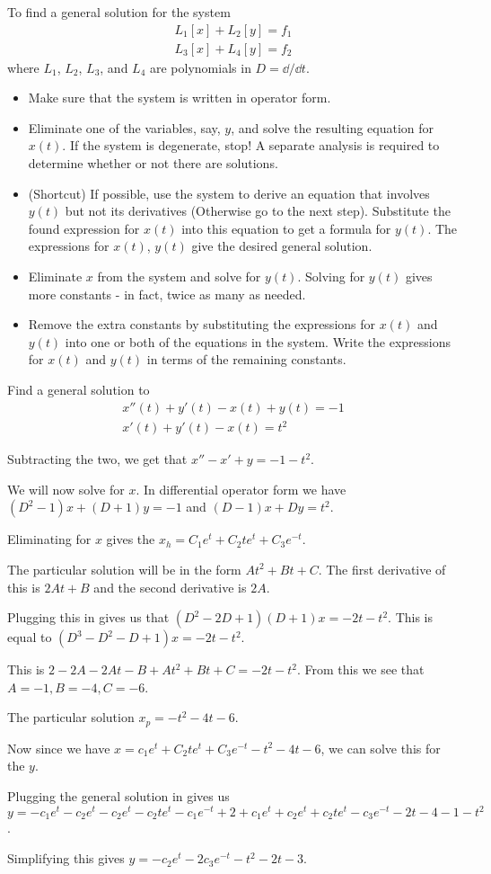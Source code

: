 \documentclass[../diffeq.tex]{subfiles}
\begin{document}
To find a general solution for the system 
\begin{align*}
    L_1[x]+L_2[y]=f_1 \\
    L_3[x]+L_4[y]=f_2    
\end{align*}
where $L_1$, $L_2$, $L_3$, and $L_4$ are polynomials in $D=\dd / \dd t$.
\begin{itemize}
    \item Make sure that the system is written in operator form.
    \item Eliminate one of the variables, say, $y$, and solve the resulting equation for $x(t)$. If the system is degenerate, stop! A separate analysis is required to determine whether or not there are solutions.
    \item (Shortcut) If possible, use the system to derive an equation that involves $y(t)$ but not its derivatives (Otherwise go to the next step). Substitute the found expression for $x(t)$ into this equation to get a formula for $y(t)$. The expressions for $x(t)$, $y(t)$ give the desired general solution.
    \item Eliminate $x$ from the system and solve for $y(t)$. Solving for $y(t)$ gives more constants - in fact, twice as many as needed.
    \item Remove the extra constants by substituting the expressions for $x(t)$ and $y(t)$ into one or both of the equations in the system. Write the expressions for $x(t)$ and $y(t)$ in terms of the remaining constants.
\end{itemize}

\begin{example}
    Find a general solution to 
    \begin{align*}
        x''(t)+y'(t)-x(t)+y(t)=-1 \\ 
        x'(t)+y'(t)-x(t)=t^2
    \end{align*}

    Subtracting the two, we get that $x''-x'+y=-1-t^2$.

    We will now solve for $x$. In differential operator form we have $(D^2-1)x+(D+1)y=-1$ and $(D-1)x+Dy=t^2$.

    Eliminating for $x$ gives the $x_h=C_1e^t+C_2te^t+C_3e^{-t}$.

    The particular solution will be in the form $At^2+Bt+C$. The first derivative of this is $2At+B$ and the second derivative is $2A$.

    Plugging this in gives us that $(D^2-2D+1)(D+1)x=-2t-t^2$. This is equal to $(D^3-D^2-D+1)x=-2t-t^2$.

    This is $2-2A-2At-B+At^2+Bt+C=-2t-t^2$. From this we see that $A=-1, B=-4, C=-6$.

    The particular solution $x_p=-t^2-4t-6$.

    Now since we have $x=c_1e^t+C_2te^t+C_3e^{-t}-t^2-4t-6$, we can solve this for the $y$.

    Plugging the general solution in gives us $y=-c_1e^t-c_2e^t-c_2e^t-c_2te^t-c_1e^{-t}+2+c_1e^t+c_2e^t+c_2te^t-c_3e^{-t}-2t-4-1-t^2$.

    Simplifying this gives $y=-c_2e^t-2c_3e^{-t}-t^2-2t-3$.
\end{example}
\end{document}
